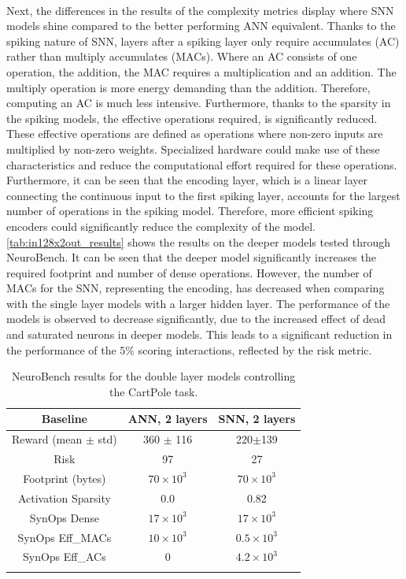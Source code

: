 \\
Next, the differences in the results of the complexity metrics display where SNN models shine compared to the better performing ANN equivalent. Thanks to the spiking nature of SNN, layers after a spiking layer only require accumulates (AC) rather than multiply accumulates (MACs). Where an AC consists of one operation, the addition, the MAC requires a multiplication and an addition. The multiply operation is more energy demanding than the addition. Therefore, computing an AC is much less intensive. Furthermore, thanks to the sparsity in the spiking models, the effective operations required, is significantly reduced. These effective operations are defined as operations where non-zero inputs are multiplied by non-zero weights. Specialized hardware could make use of these characteristics and reduce the computational effort required for these operations. Furthermore, it can be seen that the encoding layer, which is a linear layer connecting the continuous input to the first spiking layer, accounts for the largest number of operations in the spiking model. Therefore, more efficient spiking encoders could significantly reduce the complexity of the model.
\\
\autoref{tab:in128x2out_results} shows the results on the deeper models tested through NeuroBench. It can be seen that the deeper model significantly increases the required footprint and number of dense operations. However, the number of MACs for the SNN, representing the encoding, has decreased when comparing with the single layer models with a larger hidden layer. The performance of the models is observed to decrease significantly, due to the increased effect of dead and saturated neurons in deeper models. This leads to a significant reduction in the performance of the $5\%$ scoring interactions, reflected by the risk metric.
\begin{table}[ht]
\centering
\renewcommand{\arraystretch}{1.5}
\begin{tabular}{c|cc} \thickhline
 Baseline & ANN, 2 layers& SNN, 2 layers\\ \hline
 Reward (mean $\pm$ std) & 360 $\pm$ 116 & 220$\pm$139 \\
 Risk & 97 & 27\\ \hline
 Footprint (bytes) & $70 \times 10^3$ & $70 \times 10^3$ \\
 Activation Sparsity & 0.0 & 0.82\\
 SynOps Dense & $17 \times 10^{3}$ & $17 \times 10^{3}$ \\
 SynOps Eff\_MACs & $10 \times 10^{3}$ & $0.5\times 10^{3}$ \\
 SynOps Eff\_ACs & 0 & $4.2 \times 10^{3}$\\ \thickhline
\end{tabular}
\caption{NeuroBench results for the double layer models controlling the CartPole task.}
\label{tab:in128x2out_results}
\end{table}

